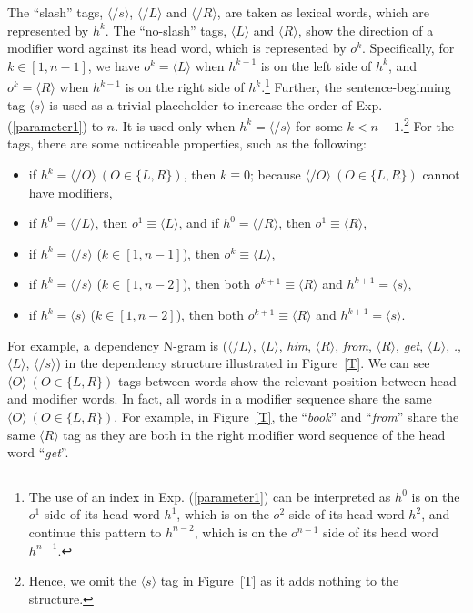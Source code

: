 \documentclass[english]{jnlp_1.4}
\begin{document}
The ``slash'' tags, $\langle \slash s \rangle$, $\langle \slash L \rangle$ and $\langle \slash R \rangle$, are taken as lexical words, which are represented by $h^k$. The ``no-slash'' tags, $\langle L \rangle$ and $\langle R \rangle$, show the direction of a modifier word against its head word, which is represented by $o^k$. Specifically, for $k \in [1,n-1]$, we have $o^k=\langle L \rangle$ when $h^{k-1}$ is on the left side of $h^k$, and $o^k=\langle R \rangle$ when $h^{k-1}$ is on the right side of $h^k$.\footnote{The use of an index in Exp. (\ref{parameter1}) can be interpreted as $h^0$ is on the $o^1$ side of its head word $h^1$, which is on the $o^2$ side of its head word $h^2$, and continue this pattern to $h^{n-2}$, which is on the $o^{n-1}$ side of its head word $h^{n-1}$.}
Further, the sentence-beginning tag $\langle s \rangle$ is used as a trivial placeholder to increase the order of Exp. (\ref{parameter1}) to $n$. It is used only when $h^k = \langle \slash s \rangle$ for some $k<n-1$.\footnote{Hence, we omit the $\langle s \rangle$ tag in Figure~\ref{T} as it adds nothing to the structure.}
For the tags, there are some noticeable properties, such as the following:
\begin{itemize}
\item if $h^k = \langle \slash O \rangle\ (O \in \{L, R\})$, then $k \equiv 0$; because $\langle \slash O \rangle\ (O \in \{L, R\})$ cannot have modifiers,
\item if $h^0 = \langle \slash L \rangle$, then $o^1 \equiv \langle L \rangle$, and if $h^0 = \langle \slash R \rangle$, then $o^1 \equiv \langle R \rangle$,
\item if $h^k = \langle \slash s \rangle$ ($k \in [1, n-1]$), then $o^k \equiv \langle L \rangle$,
\item if $h^k = \langle \slash s \rangle$ ($k \in [1, n-2]$), then both $o^{k+1} \equiv \langle R \rangle$ and $h^{k+1} = \langle s \rangle$,
\item if $h^k = \langle s \rangle$ ($k \in [1, n-2]$), then both $o^{k+1} \equiv \langle R \rangle$ and $h^{k+1} = \langle s \rangle$.
\end{itemize}

For example, a dependency N-gram is ($\langle \slash L \rangle$, $\langle L \rangle$, \emph{him}, $\langle R \rangle$, \emph{from}, $\langle R \rangle$, \emph{get}, $\langle L \rangle$, \emph{.}, $\langle L \rangle$, $\langle \slash s \rangle$) in the dependency structure illustrated in Figure~{\ref{T}}. We can see $\langle O \rangle\ (O \in \{L, R\}) $ tags between words show the relevant position between head and modifier words. In fact, all words in a modifier sequence share the same $\langle O \rangle\ (O \in \{L, R\}) $. For example, in Figure~\ref{T}, the ``\emph{book}'' and ``\emph{from}'' share the same $\langle R \rangle$ tag as they are both in the right modifier word sequence of the head word ``\emph{get}''.
\end{document}
